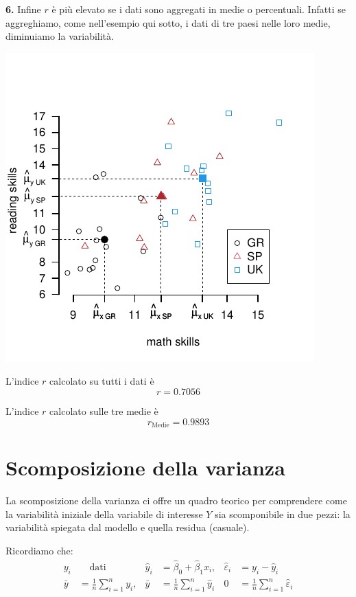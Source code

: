 \documentclass[
  11pt,
]{book}
\theoremstyle{mytheoremstyle}
\theoremstyle{mydefstyle}
\begin{document}
\textbf{6.} Infine \(r\) è più elevato se i dati sono aggregati in medie o percentuali. Infatti se aggreghiamo, come nell'esempio qui sotto, i dati di tre paesi nelle loro medie, diminuiamo la variabilità.

\begin{center}\includegraphics{Appunti_di_Statistica_2025_files/figure-latex/17-regressione-I-54-1} \end{center}

L'indice \(r\) calcolato su tutti i dati è
\[r = 0.7056\]

L'indice \(r\) calcolato sulle tre medie è
\[r_{\text{Medie}} = 0.9893\]

\section{Scomposizione della varianza}\label{scomposizione-della-varianza}

La scomposizione della varianza ci offre un quadro teorico per comprendere
come la variabilità iniziale della variabile di interesse \(Y\) sia scomponibile
in due pezzi: la variabilità spiegata dal modello e quella residua (casuale).

Ricordiamo che:
\[\begin{aligned}
y_i &\phantom{=}\text{ dati } &\hat y_i &= \hat \beta_0+\hat\beta_1x_i,& \hat\varepsilon_i &= y_i-\hat y_i\\
\bar y &= \frac 1 n\sum_{i=1}^n y_i,& \bar y &= \frac 1 n\sum_{i=1}^n \hat y_i &
0  &=\frac 1 n\sum_{i=1}^n\hat\varepsilon_i
\end{aligned}\]
\end{document}
